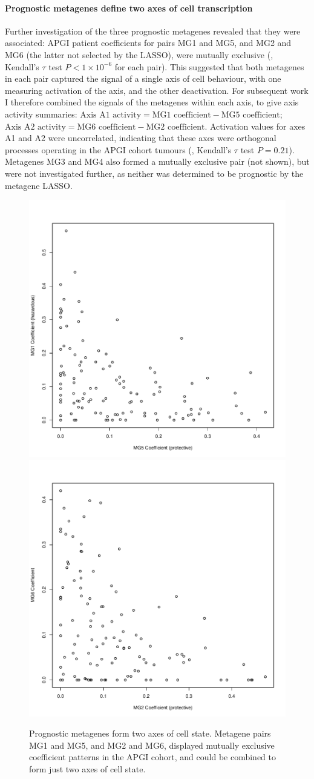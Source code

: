 \documentclass[dissertation.tex]{subfiles}
\begin{document}
\paragraph{Prognostic metagenes define two axes of cell transcription}
Further investigation of the three prognostic metagenes revealed that they were associated: \gls{APGI} patient coefficients for pairs MG1 and MG5, and MG2 and MG6 (the latter not selected by the \gls{LASSO}), were mutually exclusive (, Kendall's $\tau$ test $P < 1 \times 10^{-6}$ for each pair).  This suggested that both metagenes in each pair captured the signal of a single axis of cell behaviour, with one measuring activation of the axis, and the other deactivation.  For subsequent work I therefore combined the signals of the metagenes within each axis, to give axis activity summaries: $\text{Axis A1 activity} = \text{MG1 coefficient} - \text{MG5 coefficient}$; $\text{Axis A2 activity} = \text{MG6 coefficient} - \text{MG2 coefficient}$.  Activation values for axes A1 and A2 were uncorrelated, indicating that these axes were orthogonal processes operating in the \gls{APGI} cohort tumours (, Kendall's $\tau$ test $P = 0.21$).  Metagenes MG3 and MG4 also formed a mutually exclusive pair (not shown), but were not investigated further, as neither was determined to be prognostic by the metagene \gls{LASSO}.

\begin{figure}
\centering
\includegraphics[width=.45\linewidth]{analysis/biosurv/reports/18_SIS_diag_dsd_final/figure/metagene-pairs-8}
\includegraphics[width=.45\linewidth]{analysis/biosurv/reports/18_SIS_diag_dsd_final/figure/metagene-pairs-9}
\caption[Prognostic metagenes form two axes of cell state]{Prognostic metagenes form two axes of cell state.  Metagene pairs MG1 and MG5, and MG2 and MG6, displayed mutually exclusive coefficient patterns in the \acrshort{APGI} cohort, and could be combined to form just two axes of cell state.}\label{fig:sigs-coef-mutualexclusion}
\end{figure}
\end{document}
